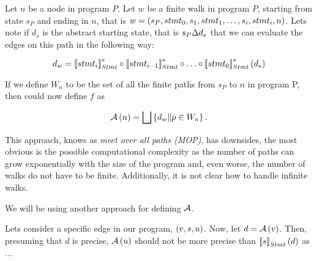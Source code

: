 \documentclass[..thesis.tex]{subfiles}
\begin{document}
Let $n$ be a node in program $P$. Let $w$ be a finite walk in program $P$, starting from state $s_P$ and ending in $n$, that is $w = \left( s_P, stmt_0, s_1, stmt_1, \ldots, s_i, stmt_i, n \right)$. Lets note if $d_s$ is the abstract starting state, that is $s_P \Delta d_s$  that we can evaluate the edges on this path in the following way:

\begin{equation*}
d_w = \left\llbracket stmt_i \right\rrbracket_{Stmt}^{*} \circ \left\llbracket stmt_{i-1} \right\rrbracket_{Stmt}^{*} \circ \ldots \circ  \left\llbracket stmt_0 \right\rrbracket_{Stmt}^{*} \left( d_s \right)  
\end{equation*}
  
If we define $W_n$ to be the set of all the finite paths from $s_P$ to $n$ in program P, then could now define $f$ as

\begin{equation*}
\mathcal{A} \left( n \right) = \bigsqcup \left\lbrace d_w \| p \in W_n \right\rbrace \text{.} 
\end{equation*}  


This approach, knows as \textit{meet over all  paths (MOP)}, has downsides, the most obvious is the possible computational complexity as the number of paths can grow exponentially with the size of the program and, even worse, the number of walks do not have to be finite. Additionally, it is not clear how to handle infinite walks. 

We will be using another approach for defining $\mathcal{A}$.


Lets consider a specific edge in our program, $\left( v, s, u \right)$. Now, let $d = \mathcal{A} \left( v \right)$. Then, presuming that $d$ is precise, $\mathcal{A} \left( u \right) $ should not be more precise than $\left\llbracket s \right\rrbracket_{Stmt} \left( d \right)$ as ...

  
\end{document}
